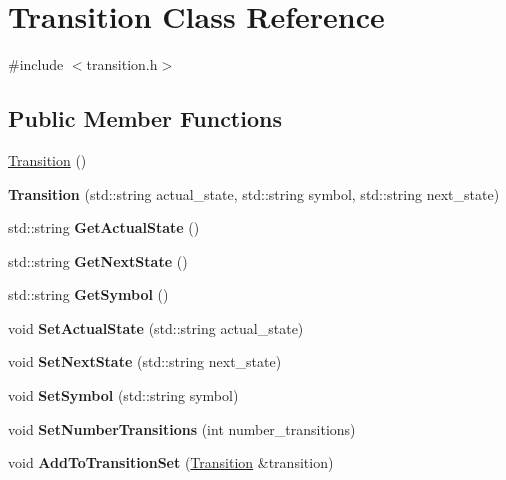 \hypertarget{classTransition}{}\section{Transition Class Reference}
\label{classTransition}


{\ttfamily \#include $<$transition.\+h$>$}

\subsection*{Public Member Functions}
\begin{DoxyCompactItemize}
\item 
\hyperlink{classTransition_a73b44b2338b11807f77b620a3e810f92}{Transition} ()
\item 
\mbox{\label{classTransition_ace14152c505810535ce6c2166a92582f}} 
{\bfseries Transition} (std\+::string actual\+\_\+state, std\+::string symbol, std\+::string next\+\_\+state)
\item 
\mbox{\label{classTransition_af562921b1f4c018dbd23175f068177dd}} 
std\+::string {\bfseries Get\+Actual\+State} ()
\item 
\mbox{\label{classTransition_a3ffdd67d98d0c6158c73b691f10e4392}} 
std\+::string {\bfseries Get\+Next\+State} ()
\item 
\mbox{\label{classTransition_a21056331ad32e3f32370127c6cf4be24}} 
std\+::string {\bfseries Get\+Symbol} ()
\item 
\mbox{\label{classTransition_a7885360c211f7f35ff72f9a3b868aa35}} 
void {\bfseries Set\+Actual\+State} (std\+::string actual\+\_\+state)
\item 
\mbox{\label{classTransition_ae5d10fa5a007a2315b5ded4515ff88f0}} 
void {\bfseries Set\+Next\+State} (std\+::string next\+\_\+state)
\item 
\mbox{\label{classTransition_a0040651c4cc7205f51158d2c5c8bab16}} 
void {\bfseries Set\+Symbol} (std\+::string symbol)
\item 
\mbox{\label{classTransition_ab7bee49e1cdf54cf7dd5f82c3fbeb93f}} 
void {\bfseries Set\+Number\+Transitions} (int number\+\_\+transitions)
\item 
\mbox{\label{classTransition_a03732624209bd0e25ee8dd57f113304c}} 
void {\bfseries Add\+To\+Transition\+Set} (\hyperlink{classTransition}{Transition} \&transition)
\end{DoxyCompactItemize}
